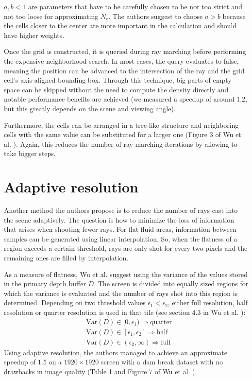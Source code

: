 $a, b < 1$ are parameters that have to be carefully chosen to be not too strict and not too loose for approximating $N_c$. The authors suggest to choose $a > b$ because the cells closer to the center are more important in the calculation and should have higher weights.

Once the grid is constructed, it is queried during ray marching before performing the expensive neighborhood search. In most cases, the query evaluates to false, meaning the position can be advanced to the intersection of the ray and the grid cell's axis-aligned bounding box. Through this technique, big parts of empty space can be skipped without the need to compute the density directly and notable performance benefits are achieved (we measured a speedup of around $1.2$, but this greatly depends on the scene and viewing angle).

Furthermore, the cells can be arranged in a tree-like structure and neighboring cells with the same value can be substituted for a larger one (Figure 3 of Wu et al. \cite{Wu:2022}). Again, this reduces the number of ray marching iterations by allowing to take bigger steps.


\section{Adaptive resolution}

Another method the authors propose is to reduce the number of rays cast into the scene adaptively. The question is how to minimize the loss of information that arises when shooting fewer rays. For flat fluid areas, information between samples can be generated using linear interpolation. So, when the flatness of a region exceeds a certain threshold, rays are only shot for every two pixels and the remaining ones are filled by interpolation.

As a measure of flatness, Wu et al. suggest using the variance of the values stored in the primary depth buffer $D$. The screen is divided into equally sized regions for which the variance is evaluated and the number of rays shot into this region is determined. Depending on two threshold values $\epsilon_1 < \epsilon_2$, either full resolution, half resolution or quarter resolution is used in that tile (see section 4.3 in Wu et al. \cite{Wu:2022}):
\begin{align*}
& \text{Var}(D) \in [0, \epsilon_1) \Rightarrow \text{quarter} \\
& \text{Var}(D) \in [\epsilon_1, \epsilon_2] \Rightarrow \text{half} \\
& \text{Var}(D) \in (\epsilon_2, \infty) \Rightarrow \text{full}
\end{align*}
Using adaptive resolution, the authors managed to achieve an approximate speedup of $1.5$ on a $1920 \times 1920$ screen with a dam break dataset with no drawbacks in image quality (Table 1 and Figure 7 of Wu et al. \cite{Wu:2022}).
